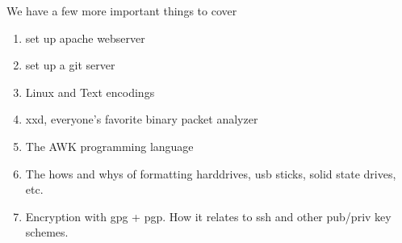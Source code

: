 \documentclass[10pt]{article}
\begin{document}
We have a few more important things to cover
\begin{enumerate}
\item set up apache webserver
\item set up a git server
\item Linux and Text encodings
\item xxd, everyone's favorite binary packet analyzer
\item The AWK programming language
\item The hows and whys of formatting harddrives, usb sticks, solid state drives, etc.
\item Encryption with gpg + pgp. How it relates to ssh and other pub/priv key schemes.
\end{enumerate}
\end{document}
